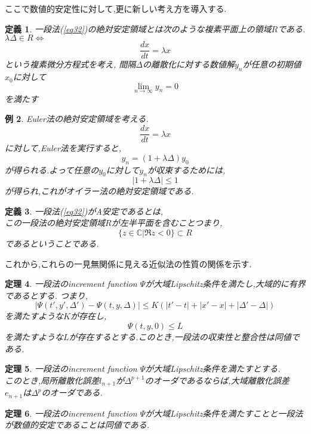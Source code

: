 \documentclass[a4paper]{jreport}
\numberwithin{equation}{section}
\newtheorem{Thm}     {定理}[section]
\newtheorem{Def}     [Thm]{定義}
\newtheorem{Ex}      [Thm]{例}
\renewenvironment{leftbar}{%
  \def\FrameCommand{\vrule width 1pt \hspace{10pt}}%
  \MakeFramed {\advance\hsize-\width \FrameRestore}}%
 {\endMakeFramed}
\def\C{\mathbb C}
\def\iff{\Leftrightarrow}
\def\thm{\begin{leftbar}\begin{Thm}}
\def\thmx{\end{Thm}\end{leftbar}}
\def\defb{\begin{leftbar}\begin{Def}}
\def\defx{\end{Def}\end{leftbar}}
\def\ex{\begin{Ex}}
\def\exx{\end{Ex}}
\begin{document}
ここで数値的安定性に対して,更に新しい考え方を導入する.
\defb
一段法(\ref{eq32})の絶対安定領域とは次のような複素平面上の領域$R$である.
\\
$\lambda \Delta \in R \iff $
\[
\frac{dx}{dt} = \lambda x
\]
という複素微分方程式を考え,
間隔$\Delta$の離散化に対する数値解$y_n$が任意の初期値$x_0$に対して
\[
\lim_{n\to\infty} y_n = 0
\]
を満たす
\defx
\ex
Euler法の絶対安定領域を考える.\\
\[
\frac{dx}{dt} = \lambda x
\]
に対して,Euler法を実行すると,\\
\[
y_n = (1+\lambda\Delta)y_0
\]
が得られる.よって任意の$y_0$に対して$y_n$が収束するためには,
\[
|1+\lambda\Delta| \le 1
\]
が得られ,これがオイラー法の絶対安定領域である.
\exx
\defb
一段法(\ref{eq32})がA安定であるとは,\\
この一段法の絶対安定領域$R$が左半平面を含むことつまり,
\[
\{z \in \C | \Re z < 0 \} \subset R
\]
であるということである.
\defx
これから,これらの一見無関係に見える近似法の性質の関係を示す.
\thm
一段法のincrement function $\Psi$が大域Lipschitz条件を満たし,大域的に有界であるとする.
つまり,
\[
|\Psi(t',y',\Delta') -\Psi(t,y,\Delta)| \le K (|t'-t| + |x'-x| + |\Delta' - \Delta|)
\]
を満たすような$K$が存在し,
\[
\Psi(t,y,0) \le L
\]
を満たすような$L$が存在するとする.このとき,一段法の収束性と整合性は同値である.
\thmx
\thm
一段法のincrement function  $\Psi$が大域Lipschitz条件を満たすとする.\\
このとき,局所離散化誤差$l_{n+1}$が$\Delta^{p+1}$のオーダであるならば,大域離散化誤差$e_{n+1}$は$\Delta^{p}$のオーダである.
\thmx

\thm
一段法のincrement function  $\Psi$が大域Lipschitz条件を満たすことと一段法が数値的安定であることは同値である.
\thmx
\end{document}
